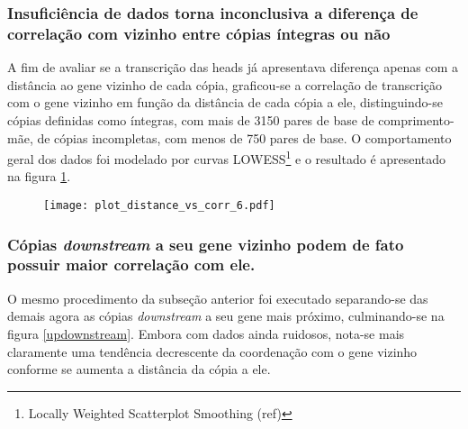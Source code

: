 \documentclass[12pt]{article}
\begin{document}
\begin{multicols}{2}
\subsubsection{Insuficiência de dados torna inconclusiva a diferença de correlação com vizinho entre cópias íntegras ou não}
A fim de avaliar se a transcrição das heads já apresentava diferença apenas com a distância ao gene vizinho de cada cópia, graficou-se a correlação de transcrição com o gene vizinho em função da distância de cada cópia a ele, distinguindo-se cópias definidas como íntegras, com mais de 3150 pares de base de comprimento-mãe, de cópias incompletas, com menos de 750 pares de base. O comportamento geral dos dados foi modelado por curvas LOWESS\footnote{Locally Weighted Scatterplot Smoothing (ref)} e o resultado é apresentado na figura \ref{completude}.

\begin{figure}[H]
	\centering
	\label{completude}
	\texttt{[image: plot\_distance\_vs\_corr\_6.pdf]}
\end{figure}

% 


\subsubsection{Cópias \textit{downstream} a seu gene vizinho podem de fato possuir maior correlação com ele.}
O mesmo procedimento da subseção anterior foi executado separando-se das demais agora as cópias \textit{downstream} a seu gene mais próximo, culminando-se na figura \ref{updownstream}. Embora com dados ainda ruidosos, nota-se mais claramente uma tendência decrescente da coordenação com o gene vizinho conforme se aumenta a distância da cópia a ele.


\end{multicols}
\end{document}
